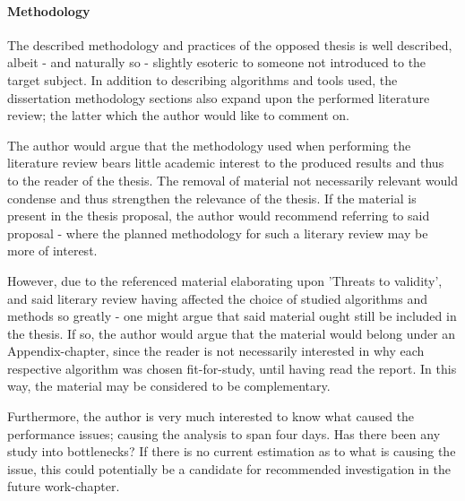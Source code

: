 
\paragraph{Methodology}
\label{par:methodology}
The described methodology and practices of the opposed thesis is well described, albeit - and naturally so - slightly esoteric to someone not introduced to the target subject.
In addition to describing algorithms and tools used, the dissertation methodology sections also expand upon the performed literature review; the latter which the author would like to comment on.

The author would argue that the methodology used when performing the literature review bears little academic interest to the produced results and thus to the reader of the thesis.
The removal of material not necessarily relevant would condense and thus strengthen the relevance of the thesis.
If the material is present in the thesis proposal, the author would recommend referring to said proposal - where the planned methodology for such a literary review may be more of interest.

However, due to the referenced material elaborating upon 'Threats to validity', and said literary review having affected the choice of studied algorithms and methods so greatly - one might argue that said material ought still be included in the thesis.
If so, the author would argue that the material would belong under an Appendix-chapter, since the reader is not necessarily interested in why each respective algorithm was chosen fit-for-study, until having read the report.
In this way, the material may be considered to be complementary.

Furthermore, the author is very much interested to know what caused the performance issues; causing the analysis to span four days.
Has there been any study into bottlenecks?
If there is no current estimation as to what is causing the issue, this could potentially be a candidate for recommended investigation in the future work-chapter.
